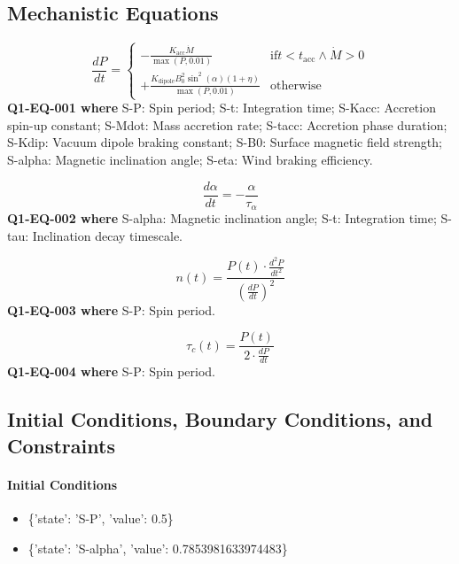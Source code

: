 \documentclass[11pt]{article}
\begin{document}
\subsection{Mechanistic Equations}

\begin{equation}\label{eq:Q1-EQ-001}
\frac{dP}{dt} = \begin{cases} -\frac{K_{\mathrm{acc}} \dot{M}}{\max(P, 0.01)} & \mathrm{if} t < t_{\mathrm{acc}} \land \dot{M} > 0 \\ +\frac{K_{\mathrm{dipole}} B_0^2 \sin^2(\alpha)(1+\eta)}{\max(P, 0.01)} & \mathrm{otherwise} \end{cases}
\end{equation}
\noindent\textbf{Q1-EQ-001 where} S-P: Spin period; S-t: Integration time; S-Kacc: Accretion spin-up constant; S-Mdot: Mass accretion rate; S-tacc: Accretion phase duration; S-Kdip: Vacuum dipole braking constant; S-B0: Surface magnetic field strength; S-alpha: Magnetic inclination angle; S-eta: Wind braking efficiency.

\begin{equation}\label{eq:Q1-EQ-002}
\frac{d\alpha}{dt} = -\frac{\alpha}{\tau_\alpha}
\end{equation}
\noindent\textbf{Q1-EQ-002 where} S-alpha: Magnetic inclination angle; S-t: Integration time; S-tau: Inclination decay timescale.

\begin{equation}\label{eq:Q1-EQ-003}
n(t) = \frac{P(t) \cdot \frac{d^2P}{dt^2}}{\left(\frac{dP}{dt}\right)^2}
\end{equation}
\noindent\textbf{Q1-EQ-003 where} S-P: Spin period.

\begin{equation}\label{eq:Q1-EQ-004}
\tau_c(t) = \frac{P(t)}{2 \cdot \frac{dP}{dt}}
\end{equation}
\noindent\textbf{Q1-EQ-004 where} S-P: Spin period.

\subsection{Initial Conditions, Boundary Conditions, and Constraints}

\paragraph{Initial Conditions}
\begin{itemize}
\item \{'state': 'S-P', 'value': 0.5\}
\item \{'state': 'S-alpha', 'value': 0.7853981633974483\}
\end{itemize}
\end{document}
